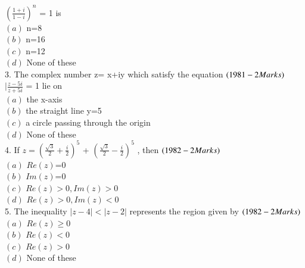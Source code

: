 \documentclass[journal,12pt,twocolumn]{IEEEtran}
\theoremstyle{remark}
\begin{document}
    $(\frac{1+i}{1-i})^n$ = 1 is\\
$(a)$  n=8\\
$(b)$  n=16\\
$(c)$  n=12\\
$(d)$  None of these\\
3.  The complex number z= x+iy which satisfy the equation $\hfill(1981 - 2 Marks)$\\
     $|\frac{z-5i}{z+5i}$ = 1 lie on \\
$(a)$  the x-axis\\
$(b)$  the straight line y=5\\
$(c)$  a circle passing through the origin \\
$(d)$  None of these\\
4.  If $z=(\frac{\sqrt{3}}{2} + \frac{i}{2})^5$ + $(\frac{\sqrt{3}}{2} - \frac{i}{2})^5$ , then $\hfill(1982 - 2 Marks)$\\
$(a)$ $Re(z)$=0\\
$(b)$ $Im(z)$=0\\
$(c)$ $Re(z)>0, Im(z)>0$\\
$(d)$ $Re(z)>0,  Im(z)<0$\\
5.  The inequality $|z-4|<|z-2|$ represents the region given by $\hfill(1982 - 2 Marks)$\\
$(a)$ $Re(z)\ge0$\\
$(b)$ $Re(z)<0$ \\
$(c)$ $Re(z)>0$ \\
$(d)$ None of these
\end{document}
